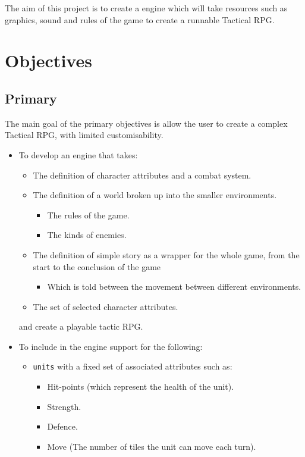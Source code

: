 The aim of this project is to create a engine which will take resources such as graphics, sound and rules of the game to create a runnable Tactical RPG.

\section{Objectives}
\subsection{Primary}
\label{primary}
The main goal of the primary objectives is allow the user to create a complex Tactical RPG, with limited customisability.  
\begin{itemize}
\item To develop an engine that takes:
\begin{itemize}

 \item The definition of character attributes and a combat system.
	\item The definition of a world broken up into the smaller environments.
	\begin{itemize}
		\item The rules of the game.
		\item The kinds of enemies.
	\end{itemize}
	
	\item The definition of simple story as a wrapper for the whole game, from the start to the conclusion of the game
	\begin{itemize}
		\item Which is told between the movement between different environments.
	\end{itemize}
	                        
	\item The set of selected character attributes.
	
\end{itemize}
and create a playable tactic RPG.

\item To include in the engine support for the following:
\begin{itemize}
	\item \texttt{units} with a fixed set of associated attributes such as:
	\begin{itemize}
		\item Hit-points (which represent the health of the unit).
		\item Strength.
		\item Defence.
		\item Move (The number of tiles the unit can move each turn).
	\end{itemize}
	

\end{itemize}
\end{itemize}
